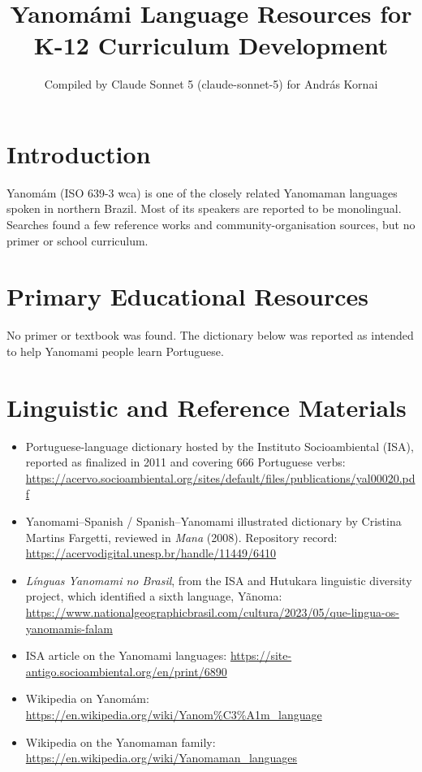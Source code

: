 \documentclass[12pt]{article}
\title{Yanom\'ami Language Resources for K-12 Curriculum Development}
\author{Compiled by Claude Sonnet 5 (claude-sonnet-5) for Andr\'as Kornai}
\date{}
\begin{document}
\maketitle

\section{Introduction}
Yanom\'am (ISO 639-3 wca) is one of the closely related Yanomaman languages spoken in northern Brazil. Most of its speakers are reported to be monolingual. Searches found a few reference works and community-organisation sources, but no primer or school curriculum.

\section{Primary Educational Resources}
No primer or textbook was found. The dictionary below was reported as intended to help Yanomami people learn Portuguese.

\section{Linguistic and Reference Materials}
\begin{itemize}
\item Portuguese-language dictionary hosted by the Instituto Socioambiental (ISA), reported as finalized in 2011 and covering 666 Portuguese verbs: \url{https://acervo.socioambiental.org/sites/default/files/publications/yal00020.pdf}
\item Yanomami--Spanish / Spanish--Yanomami illustrated dictionary by Cristina Martins Fargetti, reviewed in \emph{Mana} (2008). Repository record: \url{https://acervodigital.unesp.br/handle/11449/6410}
\item \emph{L\'inguas Yanomami no Brasil}, from the ISA and Hutukara linguistic diversity project, which identified a sixth language, Y\~anoma: \url{https://www.nationalgeographicbrasil.com/cultura/2023/05/que-lingua-os-yanomamis-falam}
\item ISA article on the Yanomami languages: \url{https://site-antigo.socioambiental.org/en/print/6890}
\item Wikipedia on Yanom\'am: \url{https://en.wikipedia.org/wiki/Yanom%C3%A1m_language}
\item Wikipedia on the Yanomaman family: \url{https://en.wikipedia.org/wiki/Yanomaman_languages}
\end{itemize}
\end{document}
